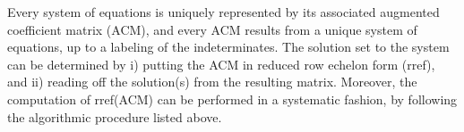 \documentclass[handout]{ximera}
\begin{document}
\begin{theorem} Every system of equations is uniquely represented by its associated augmented coefficient matrix (ACM), and every ACM results from a unique system of equations, up to a labeling of the indeterminates. The solution set to the system can be determined by i) putting the ACM in reduced row echelon form (rref), and ii) reading off the solution(s) from the resulting matrix. Moreover, the computation of rref(ACM) can be performed in a systematic fashion, by following the algorithmic procedure listed above.
\end{theorem}

\end{document}
